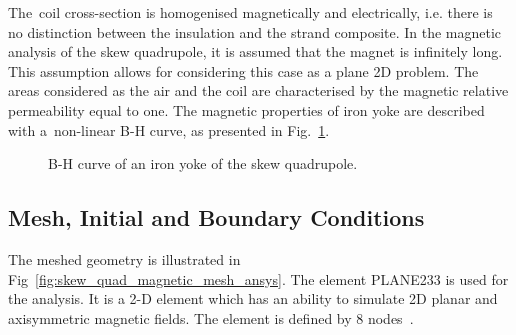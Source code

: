 The~coil cross-section is homogenised magnetically and electrically, i.e. there is no distinction between the insulation and the strand composite. In the magnetic analysis of the skew quadrupole, it is assumed that the magnet is infinitely long. This assumption allows for considering this case as a plane 2D problem. The areas considered as the air and the coil are characterised by the magnetic relative permeability equal to one. The magnetic properties of iron yoke are described with a~non-linear B-H curve, as presented in Fig.~\ref{fig:b_h_curve}. 

\begin{figure}[H]
    \centering
    \caption{B-H curve of an iron yoke of the skew quadrupole.}
    \label{fig:b_h_curve}
\end{figure}

\subsection{Mesh, Initial and Boundary Conditions}

The meshed geometry is illustrated in Fig~\ref{fig:skew_quad_magnetic_mesh_ansys}. The element PLANE233 is used for the analysis. It is a 2-D element which has an ability to simulate 2D planar and axisymmetric magnetic fields. The element is defined by 8 nodes~\cite{ansys_element_manual}.

